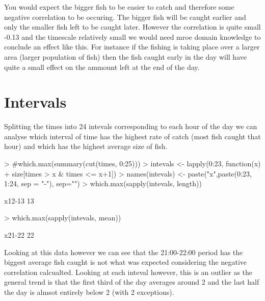 \documentclass{article}
\begin{document}
You would expect the bigger fish to be easier to catch and therefore some negative correlation to be occuring. The bigger fish will be caught earlier and only the smaller fish left to be caught later. However the correlation is quite small -0.13 and the timescale relatively small we would need mroe domain knowledge to conclude an effect like this. For instance if the fishing is taking place over a larger area (larger population of fish) then the fish caught early in the day will have quite a small effect on the ammount left at the end of the day. 
\section{Intervals}
Splitting the times into 24 intevals corresponding to each hour of the day we can analyse which interval of time has the highest rate of catch (most fish caught that hour) and which has the highest average size of fish. 
\begin{Schunk}
\begin{Sinput}
> #which.max(summary(cut(times, 0:25)))
> intevals <- lapply(0:23, function(x)
+   size[times > x & times <= x+1])
> names(intevals) <- paste("x",paste(0:23, 1:24, sep = "-"), sep="")
> which.max(sapply(intevals, length))
\end{Sinput}
\begin{Soutput}
x12-13 
    13 
\end{Soutput}
\begin{Sinput}
> which.max(sapply(intevals, mean))
\end{Sinput}
\begin{Soutput}
x21-22 
    22 
\end{Soutput}
\end{Schunk}
Looking at this data however we can see that the 21:00-22:00 period has the biggest average fish caught is not what was expected considering the negative correlation calcualted. Looking at each inteval however, this is an outlier as the general trend is that the first third of the day averages around 2 and the last half the day is almsot entirely below 2 (with 2 exceptions). 
\end{document}
